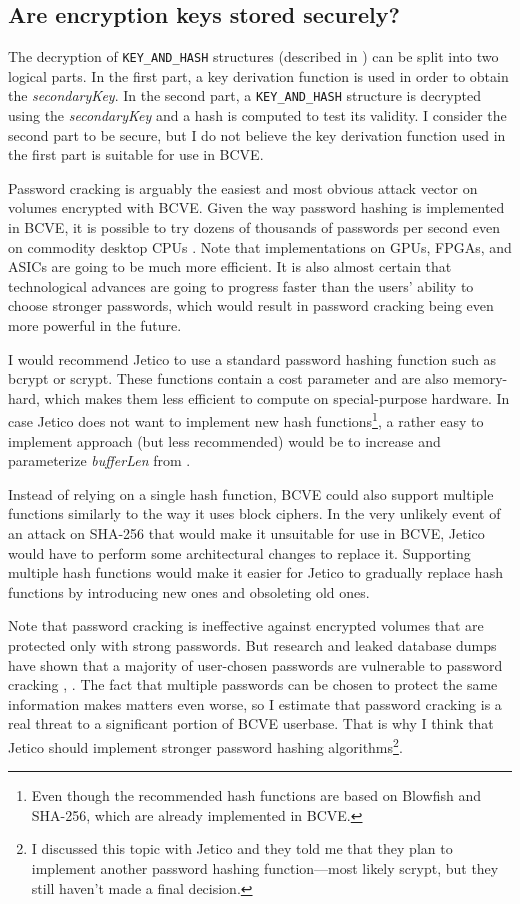 \documentclass[thesis=B,english]{FITthesis}[2012/10/20]
\begin{document}
	
	\subsection{Are encryption keys stored securely?}
	
	The decryption of \verb|KEY_AND_HASH| structures (described in ) can be split into two logical parts. In the first part, a key derivation function is used in order to obtain the \textit{secondaryKey}. In the second part, a \verb|KEY_AND_HASH| structure is decrypted using the \textit{secondaryKey} and a hash is computed to test its validity. I consider the second part to be secure, but I do not believe the key derivation function used in the first part is suitable for use in BCVE. 
	
	Password cracking is arguably the easiest and most obvious attack vector on volumes encrypted with BCVE. Given the way password hashing is implemented in BCVE, it is possible to try dozens of thousands of passwords per second even on commodity desktop CPUs \cite{shaspeed}. Note that implementations on GPUs, FPGAs, and ASICs are going to be much more efficient. It is also almost certain that technological advances are going to progress faster than the users' ability to choose stronger passwords, which would result in password cracking being even more powerful in the future.
	
	I would recommend Jetico to use a standard password hashing function such as bcrypt or scrypt. These functions contain a cost parameter and are also memory-hard, which makes them less efficient to compute on special-purpose hardware. In case Jetico does not want to implement new hash functions\footnote{Even though the recommended hash functions are based on Blowfish and SHA-256, which are already implemented in BCVE.}, a rather easy to implement approach (but less recommended) would be to increase and parameterize \textit{bufferLen} from  . 
	
	Instead of relying on a single hash function, BCVE could also support multiple functions similarly to the way it uses block ciphers. In the very unlikely event of an attack on SHA-256 that would make it unsuitable for use in BCVE, Jetico would have to perform some architectural changes to replace it. Supporting multiple hash functions would make it easier for Jetico to gradually replace hash functions by introducing new ones and obsoleting old ones.
	
	Note that password cracking is ineffective against encrypted volumes that are protected only with strong passwords. But research and leaked database dumps have shown that a majority of user-chosen passwords are vulnerable to password cracking \cite{password3}, \cite{password4}. The fact that multiple passwords can be chosen to protect the same information makes matters even worse, so I estimate that password cracking is a real threat to a significant portion of BCVE userbase. That is why I think that Jetico should implement stronger password hashing algorithms\footnote{I discussed this topic with Jetico and they told me that they plan to implement another password hashing function---most likely scrypt, but they still haven't made a final decision. }.
	
\end{document}
